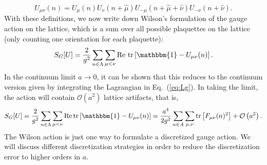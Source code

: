 \begin{equation}
    U_{\mu \nu}(n)=U_{\mu}(n) U_{\nu}(n+\hat{\mu}) U_{-\mu}(n+\hat{\mu}+\hat{\nu}) U_{-\nu}(n+\hat{\nu}).
\end{equation}
With these definitions, we now write down Wilson's formulation of the gauge action on the lattice, which is a sum over all possible plaquettes on the lattice (only counting one orientation for each plaquette):
\begin{equation}
    S_{G}[U]=\frac{2}{g^{2}} \sum_{n \in \Lambda} \sum_{\mu<\nu} \operatorname{Re}\,\operatorname{tr}\left[\mathbbm{1}-U_{\mu \nu}(n)\right].
\end{equation}
In the continuum limit $a\rightarrow 0$, it can be shown that this reduces to the continuum version given by integrating the Lagrangian in Eq.~(\ref{eq:Lg}). In taking the limit, the action will contain $\mathcal O(a^2)$ lattice artifacts, that is,
\begin{equation}
    S_{G}[U]=\frac{2}{g^{2}} \sum_{n \in \Lambda} \sum_{\mu<\nu} \operatorname{Re} \operatorname{tr}\left[\mathbbm{1}-U_{\mu \nu}(n)\right]=\frac{a^{4}}{2 g^{2}} \sum_{n \in A} \sum_{\mu, \nu} \operatorname{tr}\left[F_{\mu \nu}(n)^{2}\right]+\mathcal{O}\left(a^{2}\right).
\end{equation}
The Wilson action is just one way to formulate a discretized gauge action. We will discuss different discretization strategies in order to reduce the discretization error to higher orders in $a$.
